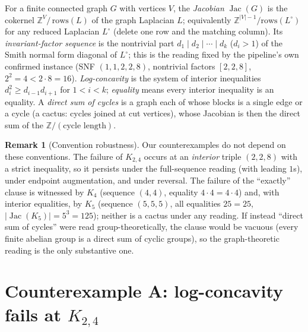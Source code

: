 \documentclass[11pt]{article}
\theoremstyle{definition}
\newtheorem{remark}{Remark}
\begin{document}
For a finite connected graph $G$ with vertices $V$, the \emph{Jacobian}
$\operatorname{Jac}(G)$ is the cokernel $\mathbb{Z}^{V}/\,\mathrm{rows}(L)$ of the
graph Laplacian $L$; equivalently $\mathbb{Z}^{|V|-1}/\mathrm{rows}(L^{\circ})$ for
any reduced Laplacian $L^{\circ}$ (delete one row and the matching column).  Its
\emph{invariant-factor sequence} is the nontrivial part $d_1 \mid d_2 \mid \dotsb \mid
d_k$ ($d_i > 1$) of the Smith normal form diagonal of $L^{\circ}$; this is the reading
fixed by the pipeline's own confirmed instance (SNF $(1,1,2,2,8)$, nontrivial factors
$[2,2,8]$, $2^2 = 4 < 2\cdot 8 = 16$).  \emph{Log-concavity} is the system of interior
inequalities $d_i^2 \ge d_{i-1} d_{i+1}$ for $1 < i < k$; \emph{equality} means every
interior inequality is an equality.  A \emph{direct sum of cycles} is a graph each of
whose blocks is a single edge or a cycle (a cactus: cycles joined at cut vertices),
whose Jacobian is then the direct sum of the $\mathbb{Z}/(\text{cycle length})$.

\begin{remark}[Convention robustness]\label{rem:robust}
Our counterexamples do not depend on these conventions.  The failure of $K_{2,4}$
occurs at an \emph{interior} triple $(2,2,8)$ with a strict inequality, so it
persists under the full-sequence reading (with leading $1$s), under endpoint
augmentation, and under reversal.  The failure of the ``exactly'' clause is witnessed
by $K_4$ (sequence $(4,4)$, equality $4\cdot 4 = 4 \cdot 4$) and, with interior
equalities, by $K_5$ (sequence $(5,5,5)$, all equalities $25 = 25$, $|\operatorname{Jac}(K_5)|
= 5^3 = 125$); neither is a cactus under any reading.  If instead ``direct sum of
cycles'' were read group-theoretically, the clause would be vacuous (every finite
abelian group is a direct sum of cyclic groups), so the graph-theoretic reading is
the only substantive one.
\end{remark}

\section{Counterexample A: log-concavity fails at $K_{2,4}$}
\end{document}
